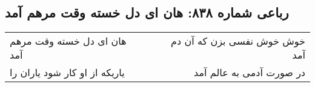 \begin{center}
\section*{رباعی شماره ۸۳۸: هان ای دل خسته وقت مرهم آمد}
\label{sec:0838}
\begin{longtable}{l p{0.5cm} r}
هان ای دل خسته وقت مرهم آمد
&&
خوش خوش نفسی بزن که آن دم آمد
\\
یاریکه از او کار شود یاران را
&&
در صورت آدمی به عالم آمد
\\
\end{longtable}
\end{center}
